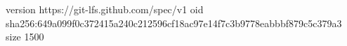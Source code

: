 version https://git-lfs.github.com/spec/v1
oid sha256:649a099f0c372415a240c212596cf18ac97e14f7c3b9778eabbbf879c5c379a3
size 1500
